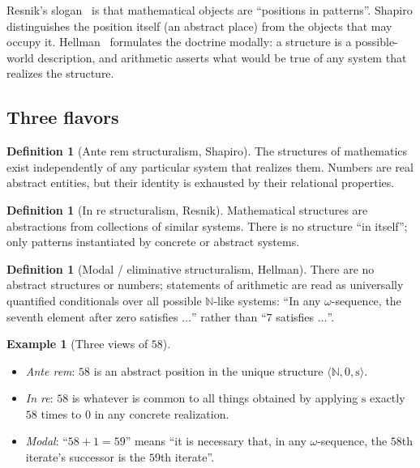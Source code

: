 \documentclass[12pt]{article}
\theoremstyle{definition}
\newtheorem{definition}[theorem]{Definition}
\newtheorem{example}[theorem]{Example}
\theoremstyle{remark}
\newcommand{\NN}{\mathbb{N}}
\newcommand{\succop}{\mathrm{s}}
\begin{document}
Resnik's slogan~\cite{Resnik1981} is that mathematical objects are ``positions in patterns''. Shapiro distinguishes the position itself (an abstract place) from the objects that may occupy it. Hellman~\cite{Hellman1989} formulates the doctrine modally: a structure is a possible-world description, and arithmetic asserts what would be true of any system that realizes the structure.

\subsection{Three flavors}

\begin{definition}[Ante rem structuralism, Shapiro]
The structures of mathematics exist independently of any particular system that realizes them. Numbers are real abstract entities, but their identity is exhausted by their relational properties.
\end{definition}

\begin{definition}[In re structuralism, Resnik]
Mathematical structures are abstractions from collections of similar systems. There is no structure ``in itself''; only patterns instantiated by concrete or abstract systems.
\end{definition}

\begin{definition}[Modal / eliminative structuralism, Hellman]
There are no abstract structures or numbers; statements of arithmetic are read as universally quantified conditionals over all possible $\NN$-like systems: ``In any $\omega$-sequence, the seventh element after zero satisfies $\dots$'' rather than ``$7$ satisfies $\dots$''.
\end{definition}

\begin{example}[Three views of $58$]\hfill
\begin{itemize}
  \item \emph{Ante rem}: $58$ is an abstract position in the unique structure $\langle \NN, 0, \succop \rangle$.
  \item \emph{In re}: $58$ is whatever is common to all things obtained by applying $\succop$ exactly $58$ times to $0$ in any concrete realization.
  \item \emph{Modal}: ``$58 + 1 = 59$'' means ``it is necessary that, in any $\omega$-sequence, the $58$th iterate's successor is the $59$th iterate''.
\end{itemize}
\end{example}
\end{document}
